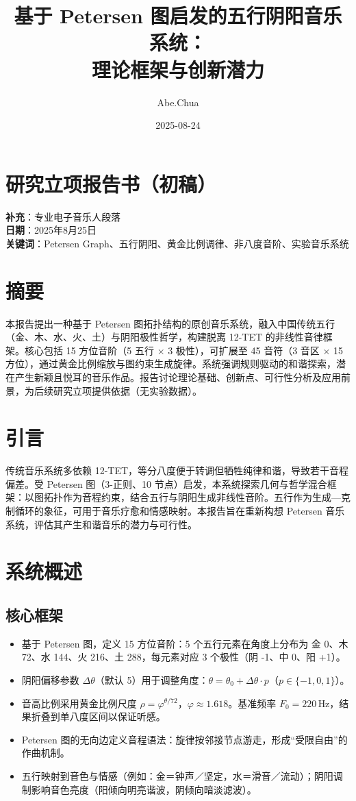\documentclass{article}
\title{基于 Petersen 图启发的五行阴阳音乐系统：\\[6pt] \large 理论框架与创新潜力}
\author{Abe.Chua}
\date{2025-08-24}
\begin{document}
\maketitle

\section*{研究立项报告书（初稿）}
\textbf{补充}：专业电子音乐人段落 \\
\textbf{日期}：2025年8月25日 \\
\textbf{关键词}：Petersen Graph、五行阴阳、黄金比例调律、非八度音阶、实验音乐系统

\section{摘要}
本报告提出一种基于 Petersen 图拓扑结构的原创音乐系统，融入中国传统五行（金、木、水、火、土）与阴阳极性哲学，构建脱离 12-TET 的非线性音律框架。核心包括 15 方位音阶（5 五行 × 3 极性），可扩展至 45 音符（3 音区 × 15 方位），通过黄金比例缩放与图约束生成旋律。系统强调规则驱动的和谐探索，潜在产生新颖且悦耳的音乐作品。报告讨论理论基础、创新点、可行性分析及应用前景，为后续研究立项提供依据（无实验数据）。

\section{引言}
传统音乐系统多依赖 12-TET，等分八度便于转调但牺牲纯律和谐，导致若干音程偏差。受 Petersen 图（3-正则、10 节点）启发，本系统探索几何与哲学混合框架：以图拓扑作为音程约束，结合五行与阴阳生成非线性音阶。五行作为生成—克制循环的象征，可用于音乐疗愈和情感映射。本报告旨在重新构想 Petersen 音乐系统，评估其产生和谐音乐的潜力与可行性。

\section{系统概述}
\subsection{核心框架}
\begin{itemize}
  \item 基于 Petersen 图，定义 15 方位音阶：5 个五行元素在角度上分布为 金 0\textdegree、木 72\textdegree、水 144\textdegree、火 216\textdegree、土 288\textdegree，每元素对应 3 个极性（阴 -1、中 0、阳 +1）。
  \item 阴阳偏移参数 $\Delta\theta$（默认 5\textdegree）用于调整角度：$\theta=\theta_0+\Delta\theta\cdot p$（$p\in\{-1,0,1\}$）。
  \item 音高比例采用黄金比例尺度 $\rho=\varphi^{\theta/72}$，$\varphi\approx1.618$。基准频率 $F_0=220\,$Hz，结果折叠到单八度区间以保证听感。
  \item Petersen 图的无向边定义音程语法：旋律按邻接节点游走，形成“受限自由”的作曲机制。
  \item 五行映射到音色与情感（例如：金＝钟声／坚定，水＝滑音／流动）；阴阳调制影响音色亮度（阳倾向明亮谐波，阴倾向暗淡滤波）。
\end{itemize}
\end{document}
